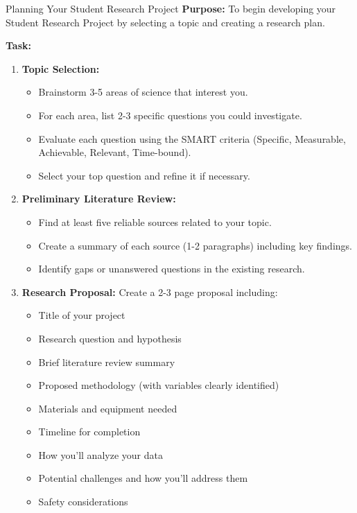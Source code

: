 \begin{investigation}{Planning Your Student Research Project}
\textbf{Purpose:} To begin developing your Student Research Project by selecting a topic and creating a research plan.

\textbf{Task:}
\begin{enumerate}
    \item \textbf{Topic Selection:} 
    \begin{itemize}
        \item Brainstorm 3-5 areas of science that interest you.
        \item For each area, list 2-3 specific questions you could investigate.
        \item Evaluate each question using the SMART criteria (Specific, Measurable, Achievable, Relevant, Time-bound).
        \item Select your top question and refine it if necessary.
    \end{itemize}
    
    \item \textbf{Preliminary Literature Review:} 
    \begin{itemize}
        \item Find at least five reliable sources related to your topic.
        \item Create a summary of each source (1-2 paragraphs) including key findings.
        \item Identify gaps or unanswered questions in the existing research.
    \end{itemize}
    
    \item \textbf{Research Proposal:} Create a 2-3 page proposal including:
    \begin{itemize}
        \item Title of your project
        \item Research question and hypothesis
        \item Brief literature review summary
        \item Proposed methodology (with variables clearly identified)
        \item Materials and equipment needed
        \item Timeline for completion
        \item How you'll analyze your data
        \item Potential challenges and how you'll address them
        \item Safety considerations
    \end{itemize}
    

\end{enumerate}
\end{investigation}
